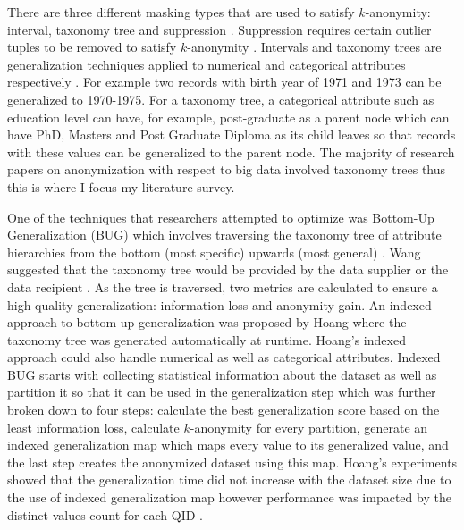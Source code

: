 \documentclass[11pt]{article}       %
\begin{document}
There are three different masking types that are used to satisfy $k$-anonymity: interval, taxonomy tree and suppression \cite{Al-Zobbi-Mohammed:2018}. Suppression requires certain outlier tuples to be removed to satisfy $k$-anonymity \cite{Samarati-P.:1998}. Intervals and taxonomy trees are generalization techniques applied to numerical and categorical attributes respectively \cite{Samarati-P.:1998}. For example two records with birth year of 1971 and 1973 can be generalized to 1970-1975. For a taxonomy tree, a categorical attribute such as education level can have, for example, post-graduate as a parent node which can have PhD, Masters and Post Graduate Diploma as its child leaves so that records with these values can be generalized to the parent node. The majority of research papers on anonymization with respect to big data involved taxonomy trees thus this is where I focus my literature survey.

One of the techniques that researchers attempted to optimize was Bottom-Up Generalization (BUG) which involves traversing the taxonomy tree of attribute hierarchies from the bottom (most specific) upwards (most general) \cite{Ke-Wang:2004}. Wang suggested that the taxonomy tree would be provided by the data supplier or the data recipient \cite{Ke-Wang:2004}. As the tree is traversed, two metrics are calculated to ensure a high quality generalization: information loss and anonymity gain. An indexed approach to bottom-up generalization was proposed by Hoang \cite{Hoang:2012} where the taxonomy tree was generated automatically at runtime. Hoang's indexed approach could also handle numerical as well as categorical attributes. Indexed BUG starts with collecting statistical information about the dataset as well as partition it so that it can be used in the generalization step which was further broken down to four steps: calculate the best generalization score based on the least information loss, calculate $k$-anonymity for every partition, generate an indexed generalization map which maps every value to its generalized value, and the last step creates the anonymized dataset using this map. Hoang's experiments showed that the generalization time did not increase with the dataset size due to the use of indexed generalization map however performance was impacted by the distinct values count for each QID \cite{Hoang:2012}.
\end{document}
